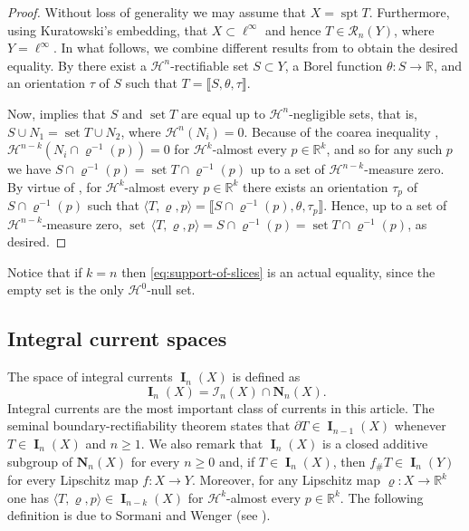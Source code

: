 \documentclass[reqno]{amsart}
\numberwithin{equation}{section}
\newcommand{\R}{\mathbb{R}}
\newcommand{\Ha}{\mathcal{H}}
\newcommand{\spt}{\operatorname{spt}}
\newcommand{\bb}[1]{\llbracket #1\rrbracket}
\DeclareMathOperator{\bI}{\mathbf{I}}
\DeclareMathOperator{\set}{set}
\renewcommand{\rho}{\varrho}
\begin{document}
\begin{proof}
Without loss of generality we may assume that \(X=\spt T\).  
Furthermore, using Kuratowski's embedding, that \(X\subset \ell^\infty\) and hence \(T\in \mathcal{R}_n(Y)\), where \(Y= \ell^\infty\). In what follows, we combine different results from \cite{amb00} to obtain the desired equality. 
By \cite[Theorem~9.1]{amb00} there exist a \(\Ha^n\)-rectifiable set \(S\subset Y\), a Borel function \(\theta\colon S \to \R\), and an orientation \(\tau\) of \(S\) such that \(T=\bb{S, \theta, \tau}\). 

Now, \cite[Theorem~9.5]{amb00} implies that \(S\) and \(\set T\) are equal up to \(\Ha^n\)-negligible sets, that is,  \(S\cup N_1= \set T \cup N_2\), where \(\Ha^n(N_i)=0\). 
Because of the coarea inequality \cite{EH21}, \(\Ha^{n-k}( N_i \cap \rho^{-1}(p))=0\) for \(\Ha^k\)-almost every \(p\in \R^k\), and so for any such \(p\) we have \(S\cap \rho^{-1}(p)=\set T \cap \rho^{-1}(p)\) up to a set of \(\Ha^{n-k}\)-measure zero. 
By virtue of \cite[Theorem~9.7]{amb00}, for \(\Ha^k\)-almost every \(p\in \R^k\) there exists an orientation \(\tau_p\) of \(S\cap \rho^{-1}(p)\) such that \(\langle T, \rho, p \rangle = \bb{S \cap \rho^{-1}(p), \theta, \tau_p}\). Hence, up to a set of \(\Ha^{n-k}\)-measure zero, \(\set\, \langle T, \rho, p \rangle = S\cap \rho^{-1}(p)=\set T \cap \rho^{-1}(p)\), as desired. 
\end{proof}

Notice that if $k=n$ then \eqref{eq:support-of-slices} is an actual equality, since the empty set is the only \(\mathcal{H}^0\)-null set.

\subsection{Integral current spaces}
The space of integral currents \(\bI_n(X)\) is defined as
\[
\bI_n(X)=\mathcal{I}_n(X) \cap \mathbf{N}_n(X).
\]
Integral currents are the most important class of currents in this article. The seminal boundary-rectifiability theorem \cite[Theorem 8.6]{amb00} states that $\partial T\in \bI_{n-1}(X)$ whenever $T\in \bI_n(X)$ and \(n\geq 1\). We also remark that \(\bI_n(X)\) is a closed additive subgroup of \(\mathbf{N}_n(X)\) for every \(n\geq 0\) and, if \(T\in \bI_n(X)\), then \(f_\# T\in \bI_n(Y)\) for every Lipschitz map \(f\colon X\to Y\). Moreover, for any Lipschitz map $\rho:X\to \R^k$ one has $\langle T,\rho,p\rangle\in \bI_{n-k}(X)$ for \(\Ha^k\)-almost every $p\in \R^k$. The following definition is due to Sormani and Wenger (see \cite[Definition 2.46]{sw11}).
\end{document}
